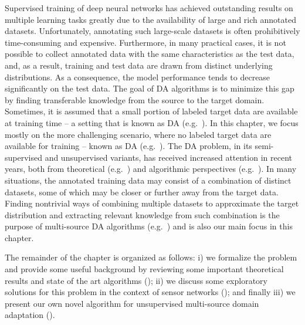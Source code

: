Supervised training of deep neural networks has achieved outstanding results on multiple learning tasks greatly due to the availability of large and rich annotated datasets. Unfortunately, annotating such large-scale datasets is often prohibitively time-consuming and expensive. Furthermore, in many practical cases, it is not possible to collect annotated data with the same characteristics as the test data, and, as a result, training and test data are drawn from distinct underlying distributions. As a consequence, the model performance tends to decrease significantly on the test data. The goal of DA algorithms is to minimize this gap by finding transferable knowledge from the source to the target domain. Sometimes, it is assumed that a small portion of labeled target data are available at training time -- a setting that is known as  DA (e.g.\ \citet{Daume2010, Donahue2013, Kumar2010, Saito2019, Yao2015}). In this chapter, we focus mostly on the more challenging scenario, where no labeled target data are available for training -- known as  DA (e.g.\ \citet{Baktashmotlagh2013, Ganin2015, Kang2019, Long2016, Zhao2018}). The DA problem, in its semi-supervised and unsupervised variants, has received increased attention in recent years, both from theoretical (e.g.\ \citet{BenDavid2010, BenDavid2007, Blitzer2008, Cortes2014, Gopalan2013, Hoffman2018, Zhao2019}) and algorithmic perspectives (e.g.\ \citet{Ajakan2014, Becker2013, Fernando2013, Jhuo2012, Long2015, Louizos2015, Sun2016, Tzeng2017}). In many situations, the annotated training data may consist of a combination of distinct datasets, some of which may be closer or further away from the target data. Finding nontrivial ways of combining multiple datasets to approximate the target distribution and extracting relevant knowledge from such combination is the purpose of multi-source DA algorithms (e.g.\ \citet{Kim2017, Guo2018, Hoffman2018, Mansour2009, Sebag2019, Zhang2015, Zhao2018}) and is also our main focus in this chapter.

The remainder of the chapter is organized as follows: i) we formalize the problem and provide some useful background by reviewing some important theoretical results and state of the art algorithms (); ii) we discuss some exploratory solutions for this problem in the context of sensor networks (); and finally iii) we present our own novel algorithm for unsupervised multi-source domain adaptation ().

